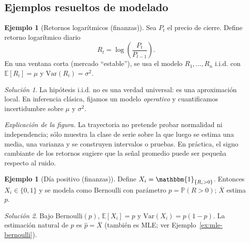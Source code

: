 \documentclass[11pt]{article}
\theoremstyle{plain}
\theoremstyle{definition}
\newtheorem{example}[theorem]{Ejemplo}
\theoremstyle{remark}
\theoremstyle{solstyle}
\newtheorem*{solution}{Solución}
\newcommand{\E}{\mathbb{E}}
\newcommand{\Var}{\mathrm{Var}}
\newcommand{\Pbb}{\mathbb{P}}
\newcommand{\1}{\mathbbm{1}}
\begin{document}
\subsection{Ejemplos resueltos de modelado}

\begin{example}[Retornos logarítmicos (finanzas)]\label{ex:model-returns}
Sea $P_t$ el precio de cierre. Define retorno logarítmico diario
\[
R_t=\log\!\left(\frac{P_t}{P_{t-1}}\right).
\]
En una ventana corta (mercado ``estable''), se usa el modelo $R_1,\dots,R_n$ i.i.d. con $\E[R_i]=\mu$ y $\Var(R_i)=\sigma^2$.
\end{example}

\begin{solution}
La hipótesis i.i.d. no es una verdad universal: es una aproximación local.
En inferencia clásica, fijamos un modelo \emph{operativo} y cuantificamos incertidumbre sobre $\mu$ y $\sigma^2$.
\end{solution}

\begin{center}
\end{center}

\noindent\textit{Explicación de la figura.} La trayectoria no pretende probar normalidad ni independencia; sólo muestra la clase de serie sobre la que luego se estima una media, una varianza y se construyen intervalos o pruebas. En práctica, el signo cambiante de los retornos sugiere que la señal promedio puede ser pequeña respecto al ruido.

\begin{example}[Día positivo (finanzas)]\label{ex:model-bernoulli}
Define $X_i=\1_{\{R_i>0\}}$. Entonces $X_i\in\{0,1\}$ y se modela como Bernoulli con parámetro
$p=\Pbb(R>0)$; $\overline X$ estima $p$.
\end{example}

\begin{solution}
Bajo Bernoulli$(p)$, $\E[X_i]=p$ y $\Var(X_i)=p(1-p)$.
La estimación natural de $p$ es $\widehat p=\overline X$ (también es MLE; ver Ejemplo~\ref{ex:mle-bernoulli}).
\end{solution}
\end{document}
